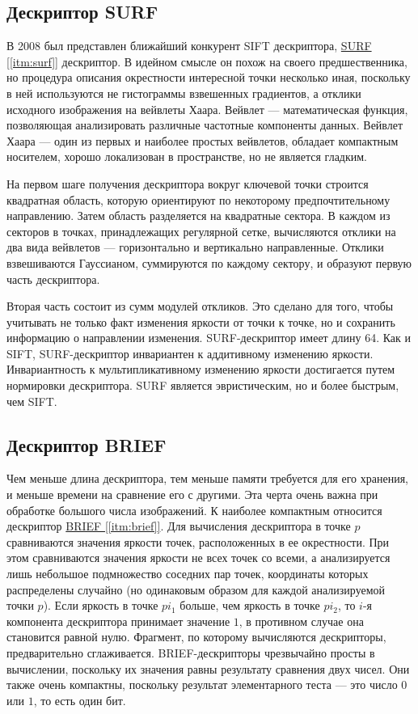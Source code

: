 \subsection{Дескриптор SURF}

В 2008 был представлен ближайший конкурент SIFT дескриптора, \hyperref[itm:surf]{ SURF [\ref{itm:surf}]} дескриптор. В идейном смысле он похож на своего предшественника, но процедура описания окрестности интересной точки несколько иная, поскольку в ней используются не гистограммы взвешенных градиентов, а отклики исходного изображения на вейвлеты Хаара. Вейвлет — математическая функция, позволяющая анализировать различные частотные компоненты данных. Вейвлет Хаара — один из первых и наиболее простых вейвлетов, обладает компактным носителем, хорошо локализован в пространстве, но не является гладким. 

На первом шаге получения дескриптора вокруг ключевой точки строится квадратная область, которую ориентируют по некоторому предпочтительному направлению. Затем область разделяется на квадратные сектора. В каждом из секторов в точках, принадлежащих регулярной сетке, вычисляются отклики на два вида вейвлетов — горизонтально и вертикально направленные. Отклики взвешиваются Гауссианом, суммируются по каждому сектору, и образуют первую часть дескриптора.

Вторая часть состоит из сумм модулей откликов. Это сделано для того, чтобы учитывать не только факт изменения яркости от точки к точке, но и сохранить информацию о направлении изменения. SURF-дескриптор имеет длину 64. Как и SIFT, SURF-дескриптор инвариантен к аддитивному изменению яркости. Инвариантность к мультипликативному изменению яркости достигается путем нормировки дескриптора. SURF является эвристическим, но и более быстрым, чем SIFT.

\subsection{Дескриптор BRIEF}

Чем меньше длина дескриптора, тем меньше памяти требуется для его хранения, и меньше времени на сравнение его с другими. Эта черта очень важна при обработке большого числа изображений. К наиболее компактным относится дескриптор \hyperref[itm:brief]{ BRIEF [\ref{itm:brief}]}. Для вычисления дескриптора в точке $p$ сравниваются значения яркости точек, расположенных в ее окрестности. При этом сравниваются значения яркости не всех точек со всеми, а анализируется лишь небольшое подмножество соседних пар точек, координаты которых распределены случайно (но одинаковым образом для каждой анализируемой точки $p$). Если яркость в точке $pi_1$ больше, чем яркость в точке $pi_2$, то $i$-я компонента дескриптора принимает значение $1$, в противном случае она становится равной нулю. Фрагмент, по которому вычисляются дескрипторы, предварительно сглаживается. BRIEF-дескрипторы чрезвычайно просты в вычислении, поскольку их значения равны результату сравнения двух чисел. Они также очень компактны, поскольку результат элементарного теста — это число $0$ или $1$, то есть один бит.

